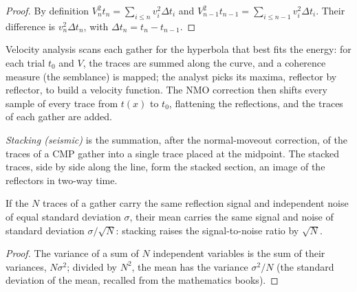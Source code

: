 \begin{proof}
By definition $V_n^2t_n = \sum_{i\le n}v_i^2\Delta t_i$ and $V_{n-1}^2t_{n-1}
= \sum_{i\le n-1}v_i^2\Delta t_i$. Their difference is $v_n^2\Delta t_n$, with
$\Delta t_n = t_n - t_{n-1}$.
\end{proof}

Velocity analysis scans each gather for the hyperbola that best fits the
energy: for each trial $t_0$ and $V$, the traces are summed along the curve, and
a coherence measure (the semblance) is mapped; the analyst picks its maxima,
reflector by reflector, to build a velocity function. The NMO correction then
shifts every sample of every trace from $t(x)$ to $t_0$, flattening the
reflections, and the traces of each gather are added.

\begin{definition}\label{def:b3:exploration-seismology:stack}
\emph{Stacking (seismic)} is the summation, after the
normal-moveout correction, of the traces of a CMP gather into a single trace
placed at the midpoint. The stacked traces, side by side along the line, form
the stacked section, an image of the reflectors in two-way time.
\end{definition}

\begin{proposition}\label{prop:b3:exploration-seismology:sqrtN}
If the $N$ traces of a gather carry the same reflection signal and independent
noise of equal standard deviation $\sigma$, their mean carries the same signal
and noise of standard deviation $\sigma/\sqrt N$: stacking raises the
signal-to-noise ratio by $\sqrt N$.
\end{proposition}

\begin{proof}
The variance of a sum of $N$ independent variables is the sum of their
variances, $N\sigma^2$; divided by $N^2$, the mean has the variance
$\sigma^2/N$ (the standard deviation of the mean, recalled from the
mathematics books).
\end{proof}

